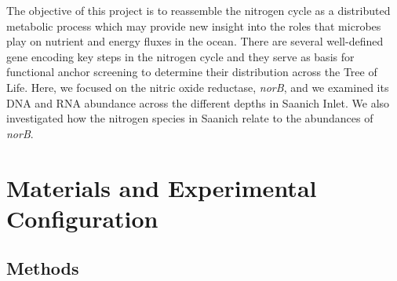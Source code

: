 \documentclass[11 pt,]{article}
\begin{document}
The objective of this project is to reassemble the nitrogen cycle as a
distributed metabolic process which may provide new insight into the
roles that microbes play on nutrient and energy fluxes in the ocean.
There are several well-defined gene encoding key steps in the nitrogen
cycle and they serve as basis for functional anchor screening to
determine their distribution across the Tree of Life. Here, we focused
on the nitric oxide reductase, \emph{norB}, and we examined its DNA and
RNA abundance across the different depths in Saanich Inlet. We also
investigated how the nitrogen species in Saanich relate to the
abundances of \emph{norB}.

\section{Materials and Experimental
Configuration}\label{materials-and-experimental-configuration}

\subsection{Methods}\label{methods}
\end{document}
